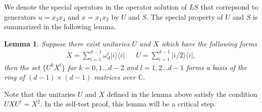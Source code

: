\documentclass[11pt,letterpaper]{article}
\newcommand{\ketbra}[2]{|#1\rangle\langle#2|}
\newcommand{\C}{\mathbb{C}}
\newcommand{\1}{\mathbb{1}}
\newcommand{\LS}{LS}
\newtheorem{lemma}[theorem]{Lemma}
\theoremstyle{definition}
\begin{document}
We denote the special operators in the operator solution of $\LS$ that correpsond to generators 
$u = x_3x_4$ and $x = x_1x_2$ by $U$ and $S$.
The special property of $U$ and $S$ is summarized in the following lemma. 
\begin{lemma}
	\label{lm:ux_independ}
	Suppose there exist unitaries $U$ and $X$ which have the following forms
	\begin{align}
		X = \sum_{i=1}^{d-1} \omega_d^i \ketbra{i}{i} && U = \sum_{i=1}^{d-1}\ketbra{i/2}{i},
	\end{align}
	then the set $\{U^k X^l\}$ for $k=0,1\dots d-2$ and $l = 1,2\dots d-1$ forms a basis of 
	the ring of $(d-1)\times (d-1)$ matrices over $\C$.
\end{lemma}
Note that the unitaries $U$ and $X$ defined in the lemma above satisfy the condition $UXU^\dagger = X^2$.
In the self-test proof, this lemma will be a critical step.
\end{document}
